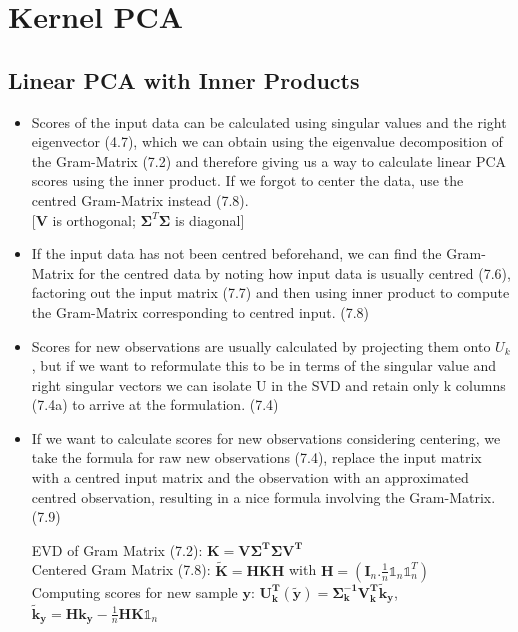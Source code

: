 \documentclass[english]{latex4ei/latex4ei_sheet}
\begin{document}
\vspace{300}
\section{Kernel PCA}
\begin{sectionbox}
\subsection{Linear PCA with Inner Products}
\begin{itemize}
\item Scores of the input data can be calculated using singular values and the right eigenvector (4.7), which we can obtain using the eigenvalue decomposition of the Gram-Matrix (7.2) and therefore giving us a way to calculate linear PCA scores using the inner product. If we forgot to center the data, use the centred Gram-Matrix instead (7.8).\\
\hspace{5}[$\mathbf{V}$ is orthogonal; $\mathbf{\Sigma}^T\mathbf{\Sigma}$ is diagonal]
\item If the input data has not been centred beforehand, we can find the Gram-Matrix for the centred data by noting how input data is usually centred (7.6), factoring out the input matrix (7.7) and then using inner product to compute the Gram-Matrix  corresponding to centred input. (7.8)
\item Scores for new observations are usually calculated by projecting them onto $U_k$, but if we want to reformulate this to be in terms of the singular value and right singular vectors we can isolate U in the SVD and retain only k columns (7.4a) to arrive at the formulation. (7.4)
\item If we want to calculate scores for new observations considering centering, we take the formula for raw new observations (7.4), replace the input matrix with a centred input matrix and the observation with an approximated centred observation, resulting in a nice formula involving the Gram-Matrix. (7.9)
\begin{emphbox}
    EVD of Gram Matrix (7.2): $\mathbf{K=V\Sigma^T\Sigma V^T}$\\
    Centered Gram Matrix (7.8): $\mathbf{\tilde{K}=HKH}$ with $\mathbf{H}=(\mathbf{I}_n.\frac{1}{n}\mathds{1}_n\mathds{1}_n^T)$\\
    Computing scores for new sample $\mathbf{y}$:
    $\mathbf{U_k^T}(\mathbf{\tilde{y}})=\mathbf{\Sigma_k^{-1}V_k^T\tilde{k}_y}$, \quad $\mathbf{\tilde{k}_y=Hk_y-}\frac{1}{n}\mathbf{HK}\mathds{1}_n$

\end{emphbox}
\end{itemize}
\end{sectionbox}
\end{document}
